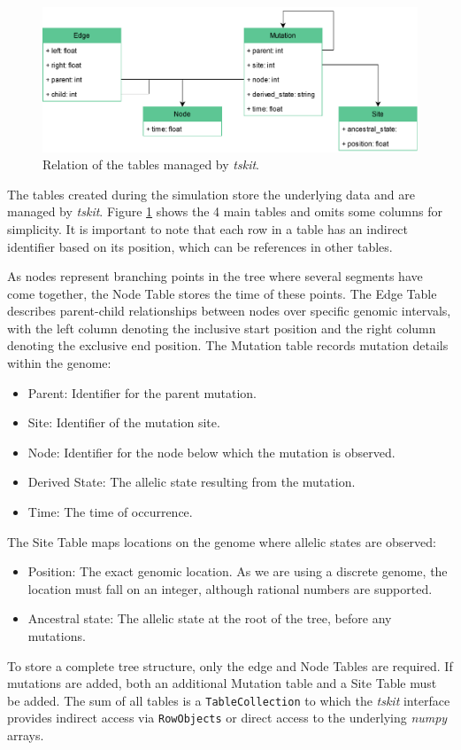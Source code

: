 \begin{figure}[h]
      \centering
      \includegraphics[width=\textwidth]{figures/tables_uml.pdf}
      \caption{Relation of the tables managed by \textit{tskit}.}
      \label{fig:tables-uml}
\end{figure}

The tables created during the simulation store the underlying data and are managed by \textit{tskit}.
Figure \ref{fig:tables-uml} shows the 4 main tables and omits some columns for simplicity.
It is important to note that each row in a table has an indirect identifier based on its position, which can be references in other tables.

As nodes represent branching points in the tree where several segments have come together, the Node Table stores the time of these points.
The Edge Table describes parent-child relationships between nodes over specific genomic intervals, with the left column denoting the inclusive start position and the right column denoting the exclusive end position.
The Mutation table records mutation details within the genome:
\begin{itemize}
      \item Parent: Identifier for the parent mutation.
      \item Site: Identifier of the mutation site.
      \item Node: Identifier for the node below which the mutation is observed.
      \item Derived State: The allelic state resulting from the mutation.
      \item Time: The time of occurrence.
\end{itemize}

The Site Table maps locations on the genome where allelic states are observed:
\begin{itemize}
      \item Position: The exact genomic location. As we are using a discrete genome, the location must fall on an integer, although rational numbers are supported.
      \item Ancestral state: The allelic state at the root of the tree, before any mutations.
\end{itemize}
To store a complete tree structure, only the edge and Node Tables are required.
If mutations are added, both an additional Mutation table and a Site Table must be added.
The sum of all tables is a \texttt{TableCollection} to which the \textit{tskit} interface provides indirect access via \texttt{RowObjects} or direct access to the underlying \textit{numpy} arrays.